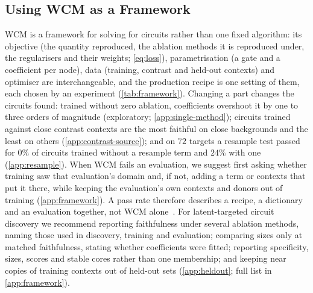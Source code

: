 \subsection{Using WCM as a Framework}
\label{sec:framework}
WCM is a framework for solving for circuits rather than one fixed algorithm: its objective (the quantity reproduced, the ablation methods it is reproduced under, the regularisers and their weights; \cref{eq:loss}), parametrisation (a gate and a coefficient per node), data (training, contrast and held-out contexts) and optimiser are interchangeable, and the production recipe is one setting of them, each chosen by an experiment (\cref{tab:framework}).
Changing a part changes the circuits found: trained without zero ablation, coefficients overshoot it by one to three orders of magnitude (exploratory; \cref{app:single-method}); circuits trained against close contrast contexts are the most faithful on close backgrounds and the least on others (\cref{app:contrast-source}); and on $72$ targets a resample test passed for $0\%$ of circuits trained without a resample term and $24\%$ with one (\cref{app:resample}).
When WCM fails an evaluation, we suggest first asking whether training saw that evaluation's domain and, if not, adding a term or contexts that put it there, while keeping the evaluation's own contexts and donors out of training (\cref{app:framework}).
A pass rate therefore describes a recipe, a dictionary and an evaluation together, not WCM alone~\citep{mueller2025mib, mahale2026explanation}.
For latent-targeted circuit discovery we recommend reporting faithfulness under several ablation methods, naming those used in discovery, training and evaluation; comparing sizes only at matched faithfulness, stating whether coefficients were fitted; reporting specificity, sizes, scores and stable cores rather than one membership; and keeping near copies of training contexts out of held-out sets (\cref{app:heldout}; full list in \cref{app:framework}).
%
\else\ifx\frameworkpart\frameworkappendix
